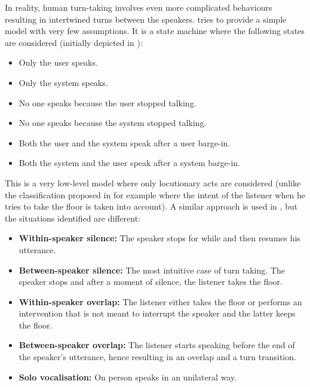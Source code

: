        In reality, human turn-taking involves even more complicated behaviours resulting in intertwined turns between the speakers. \cite{Raux2009} tries to provide a simple model with very few assumptions. It is a state machine where the following states are considered (initially depicted in \cite{Jaffe1970}):

        \begin{itemize}
          \item Only the user speaks.
          \item Only the system speaks.
          \item No one speaks because the user stopped talking.
          \item No one speaks because the system stopped talking.
          \item Both the user and the system speak after a user barge-in.
          \item Both the system and the user speak after a system barge-in.
        \end{itemize}
				
				This is a very low-level model where only locutionary acts are considered (unlike the classification proposed in \cite{Beattie1982} for example where the intent of the listener when he tries to take the floor is taken into account). A similar approach is used in \cite{Wlodarczak2013}, but the situations identified are different:

        \begin{itemize}
           \item \textbf{Within-speaker silence:} The speaker stops for while and then resumes his utterance.
           \item \textbf{Between-speaker silence:} The most intuitive case of turn taking. The speaker stops and after a moment of silence, the listener takes the floor.
           \item \textbf{Within-speaker overlap:} The listener either takes the floor or performs an intervention that is not meant to interrupt the speaker and the latter keeps the floor.
           \item \textbf{Between-speaker overlap:} The listener starts speaking before the end of the speaker's utterance, hence resulting in an overlap and a turn transition.
           \item \textbf{Solo vocalisation:} On person speaks in an unilateral way.
        \end{itemize}
				
